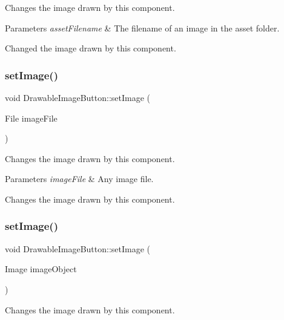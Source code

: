Changes the image drawn by this component.


\begin{DoxyParams}{Parameters}
{\em asset\+Filename} & The filename of an image in the asset folder.\\
\hline
\end{DoxyParams}
Changed the image drawn by this component. \mbox{\label{classDrawableImageButton_ad6fd2449bb0d1cd275d44f266d395135}} 
\subsubsection{\texorpdfstring{set\+Image()}{setImage()}\hspace{0.1cm}{\footnotesize\ttfamily [2/3]}}
{\footnotesize\ttfamily void Drawable\+Image\+Button\+::set\+Image (\begin{DoxyParamCaption}\item[{File}]{image\+File }\end{DoxyParamCaption})}

Changes the image drawn by this component.


\begin{DoxyParams}{Parameters}
{\em image\+File} & Any image file.\\
\hline
\end{DoxyParams}
Changes the image drawn by this component. \mbox{\label{classDrawableImageButton_a726d7b73d84c704d589db73cc89ad53c}} 
\subsubsection{\texorpdfstring{set\+Image()}{setImage()}\hspace{0.1cm}{\footnotesize\ttfamily [3/3]}}
{\footnotesize\ttfamily void Drawable\+Image\+Button\+::set\+Image (\begin{DoxyParamCaption}\item[{Image}]{image\+Object }\end{DoxyParamCaption})}

Changes the image drawn by this component.


